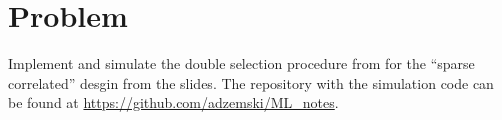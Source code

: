 \documentclass[a4paper]{scrartcl}
\begin{document}
\section*{Problem~}

Implement and simulate the double selection procedure from \textcite{belloni2014inference} for the ``sparse correlated'' desgin from the slides. The repository with the simulation code can be found at \url{https://github.com/adzemski/ML_notes}.
\end{document}

